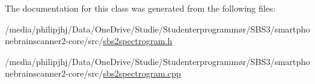 The documentation for this class was generated from the following files\-:\begin{DoxyCompactItemize}
\item 
/media/philipjhj/\-Data/\-One\-Drive/\-Studie/\-Studenterprogrammør/\-S\-B\-S3/smartphonebrainscanner2-\/core/src/\hyperlink{sbs2spectrogram_8h}{sbs2spectrogram.\-h}\item 
/media/philipjhj/\-Data/\-One\-Drive/\-Studie/\-Studenterprogrammør/\-S\-B\-S3/smartphonebrainscanner2-\/core/src/\hyperlink{sbs2spectrogram_8cpp}{sbs2spectrogram.\-cpp}\end{DoxyCompactItemize}
